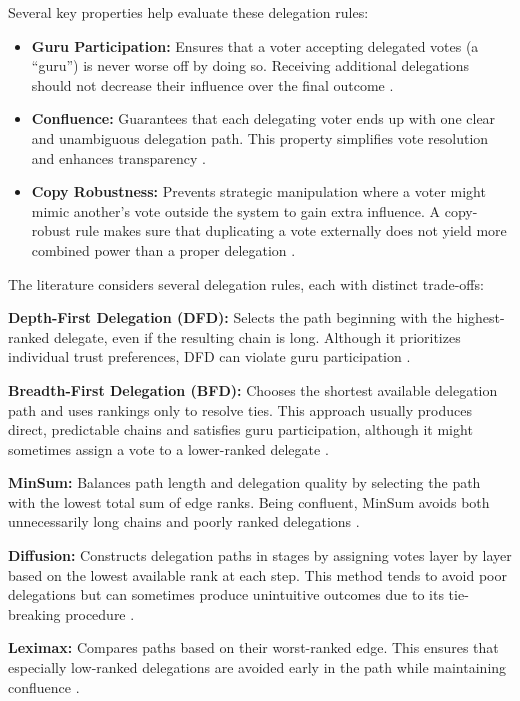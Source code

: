 Several key properties help evaluate these delegation rules:

\begin{itemize}
    \item \textbf{Guru Participation:} Ensures that a voter accepting delegated votes (a ``guru'') is never worse off by doing so. Receiving additional delegations should not decrease their influence over the final outcome \citep{kotsialou_riley_2020}. 
    \item \textbf{Confluence:} Guarantees that each delegating voter ends up with one clear and unambiguous delegation path. This property simplifies vote resolution and enhances transparency \citep{brill_liquid_2022}. 
    \item \textbf{Copy Robustness:} Prevents strategic manipulation where a voter might mimic another's vote outside the system to gain extra influence. A copy-robust rule makes sure that duplicating a vote externally does not yield more combined power than a proper delegation \citep{brill_liquid_2022,behrens_2015}. 
\end{itemize}

The literature considers several delegation rules, each with distinct trade-offs:

\textbf{Depth-First Delegation (DFD):} Selects the path beginning with the highest-ranked delegate, even if the resulting chain is long. Although it prioritizes individual trust preferences, DFD can violate guru participation \citep{kotsialou_riley_2020}.

\textbf{Breadth-First Delegation (BFD):} Chooses the shortest available delegation path and uses rankings only to resolve ties. This approach usually produces direct, predictable chains and satisfies guru participation, although it might sometimes assign a vote to a lower-ranked delegate \citep{kotsialou_riley_2020, brill_liquid_2022}.

\textbf{MinSum:} Balances path length and delegation quality by selecting the path with the lowest total sum of edge ranks. Being confluent, MinSum avoids both unnecessarily long chains and poorly ranked delegations \citep{brill_liquid_2022}.

\textbf{Diffusion:} Constructs delegation paths in stages by assigning votes layer by layer based on the lowest available rank at each step. This method tends to avoid poor delegations but can sometimes produce unintuitive outcomes due to its tie-breaking procedure \citep{brill_liquid_2022}.

\textbf{Leximax:} Compares paths based on their worst-ranked edge. This ensures that especially low-ranked delegations are avoided early in the path while maintaining confluence \citep{brill_liquid_2022}.

